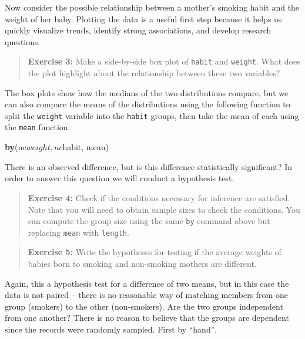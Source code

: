 \documentclass[]{book}
\newenvironment{Shaded}{\begin{snugshade}}{\end{snugshade}}
\newcommand{\KeywordTok}[1]{\textcolor[rgb]{0.13,0.29,0.53}{\textbf{{#1}}}}
\newcommand{\NormalTok}[1]{{#1}}
\theoremstyle{definition}
\theoremstyle{definition}
\theoremstyle{definition}
\theoremstyle{remark}
\begin{document}
Now consider the possible relationship between a mother's smoking habit
and the weight of her baby. Plotting the data is a useful first step
because it helps us quickly visualize trends, identify strong
associations, and develop research questions.

\begin{quote}
\textbf{Exercise 3:} Make a side-by-side box plot of \texttt{habit} and
\texttt{weight}. What does the plot highlight about the relationship
between these two variables?
\end{quote}

The box plots show how the medians of the two distributions compare, but
we can also compare the means of the distributions using the following
function to split the \texttt{weight} variable into the \texttt{habit}
groups, then take the mean of each using the \texttt{mean} function.

\begin{Shaded}
\begin{Highlighting}[]
\KeywordTok{by}\NormalTok{(nc$weight, nc$habit, mean)}
\end{Highlighting}
\end{Shaded}

There is an observed difference, but is this difference statistically
significant? In order to answer this question we will conduct a
hypothesis test.

\begin{quote}
\textbf{Exercise 4:} Check if the conditions necessary for inference are
satisfied. Note that you will need to obtain sample sizes to check the
conditions. You can compute the group size using the same \texttt{by}
command above but replacing \texttt{mean} with \texttt{length}.
\end{quote}

\begin{quote}
\textbf{Exercise 5:} Write the hypotheses for testing if the average
weights of babies born to smoking and non-smoking mothers are different.
\end{quote}

Again, this a hypothesis test for a difference of two means, but in this
case the data is not paired -- there is no reasonable way of matching
members from one group (smokers) to the other (non-smokers). Are the two
groups independent from one another? There is no reason to believe that
the groups are dependent since the records were randomly sampled. First
by ``hand'',
\end{document}
